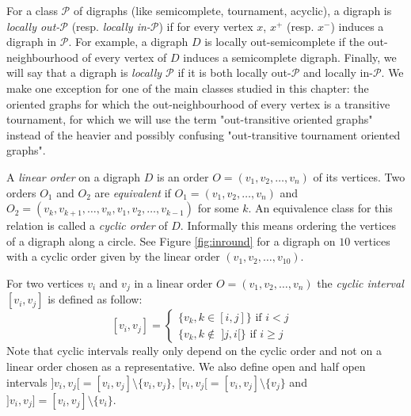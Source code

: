 For a class $\mathcal P$ of digraphs (like semicomplete, tournament, acyclic), a digraph is {\em locally out-$\mathcal P$} (resp. {\em locally in-$\mathcal P$}) if for every vertex $x$, $x^+$ (resp. $x^{-}$) induces a digraph in $\mathcal P$. 
For example, a digraph $D$ is locally out-semicomplete if the out-neighbourhood of every vertex of $D$ induces a semicomplete digraph.
Finally, we will say that a digraph is {\em locally $\mathcal P$} if it is both locally out-$\mathcal P$ and locally in-$\mathcal P$. 
We make one exception for one of the main classes studied in this chapter: the oriented graphs for which the out-neighbourhood of every vertex is a transitive tournament, for which we will use the term "out-transitive oriented graphs" instead of the heavier and possibly confusing "out-transitive tournament oriented graphs".



A {\em linear order} on a digraph $D$ is an order $O =(v_1,v_2,\ldots,v_n)$ of its vertices. Two orders $O_1$ and $O_2$ are {\em equivalent} if $O_1 =(v_1,v_2,\ldots,v_n)$ and $O_2=(v_k,v_{k+1},\ldots,v_n,v_1,v_2,\ldots, v_{k-1})$ for some $k$. An equivalence class for this relation is called a {\em cyclic order} of $D$. Informally this means ordering the vertices of a digraph along a circle. See Figure \ref{fig:inround} for a digraph on $10$ vertices with a cyclic order given by the linear order $(v_1,v_2,\ldots,v_{10})$.%

For two vertices $v_i$ and $v_j$ in a linear order $O=(v_1,v_2,\ldots,v_n)$ the \textit{cyclic interval} $[v_i,v_j]$ is defined as follow:
$$
 [v_i,v_j] =     
\begin{cases}
     \{v_k, k\in [i,j]\} \text{ if $i<j$ }\\
     \{v_k, k\not\in\; ]j,i[ \} \text{ if $i\geq j$}
    \end{cases}
$$ 
Note that cyclic intervals really only depend on the cyclic order and not on a linear order chosen as a representative. We also define open and half open intervals $]v_i,v_j[ = [v_i, v_j] \setminus \{v_i, v_j\}$,  $[v_i,v_j[ = [v_i, v_j] \setminus \{ v_j\}$ and  $]v_i,v_j] = [v_i, v_j] \setminus \{v_i\}$.


